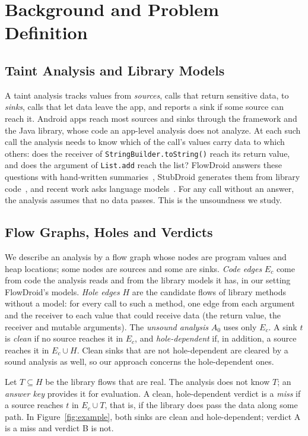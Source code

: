 \section{Background and Problem Definition}
\label{sec:background}

\subsection{Taint Analysis and Library Models}
A taint analysis tracks values from \emph{sources}, calls that return sensitive data, to \emph{sinks}, calls that let data leave the app, and reports a sink if some source can reach it.
Android apps reach most sources and sinks through the framework and the Java library, whose code an app-level analysis does not analyze.
At each such call the analysis needs to know which of the call's values carry data to which others: does the receiver of \texttt{StringBuilder.toString()} reach its return value, and does the argument of \texttt{List.add} reach the list?
FlowDroid answers these questions with hand-written summaries~\cite{flowdroid}, StubDroid generates them from library code~\cite{stubdroid}, and recent work asks language models~\cite{iris,semtaint}.
For any call without an answer, the analysis assumes that no data passes.
This is the unsoundness we study.

\subsection{Flow Graphs, Holes and Verdicts}
\label{sec:setting}
We describe an analysis by a flow graph whose nodes are program values and heap locations; some nodes are sources and some are sinks.
\emph{Code edges} $E_c$ come from code the analysis reads and from the library models it has, in our setting FlowDroid's models.
\emph{Hole edges} $H$ are the candidate flows of library methods without a model: for every call to such a method, one edge from each argument and the receiver to each value that could receive data (the return value, the receiver and mutable arguments).
The \emph{unsound analysis} $A_0$ uses only $E_c$.
A sink $t$ is \emph{clean} if no source reaches it in $E_c$, and \emph{hole-dependent} if, in addition, a source reaches it in $E_c\cup H$.
Clean sinks that are not hole-dependent are cleared by a sound analysis as well, so our approach concerns the hole-dependent ones.

Let $T\subseteq H$ be the library flows that are real.
The analysis does not know $T$; an \emph{answer key} provides it for evaluation.
A clean, hole-dependent verdict is a \emph{miss} if a source reaches $t$ in $E_c\cup T$, that is, if the library does pass the data along some path.
In Figure~\ref{fig:example}, both sinks are clean and hole-dependent; verdict A is a miss and verdict B is not.

